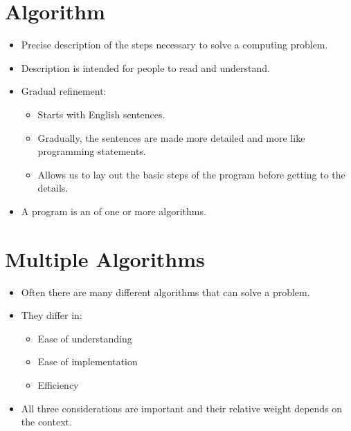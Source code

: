 \documentclass[letterpaper,10pt,english]{sphinxmanual}
\begin{document}
\section{Algorithm}
\label{\detokenize{lecture_notes/lec20_searching:algorithm}}\begin{itemize}
\item {} 
Precise description of the steps necessary to solve a computing
problem.

\item {} 
Description is intended for people to read and understand.

\item {} 
Gradual refinement:
\begin{itemize}
\item {} 
Starts with English sentences.

\item {} 
Gradually, the sentences are made more detailed and more like
programming statements.

\item {} 
Allows us to lay out the basic steps of the program before getting
to the details.

\end{itemize}

\item {} 
A program is an  of one or more algorithms.

\end{itemize}


\section{Multiple Algorithms}
\label{\detokenize{lecture_notes/lec20_searching:multiple-algorithms}}\begin{itemize}
\item {} 
Often there are many different algorithms that can solve a problem.

\item {} 
They differ in:
\begin{itemize}
\item {} 
Ease of understanding

\item {} 
Ease of implementation

\item {} 
Efficiency

\end{itemize}

\item {} 
All three considerations are important and their relative weight
depends on the context.

\end{itemize}
\end{document}

